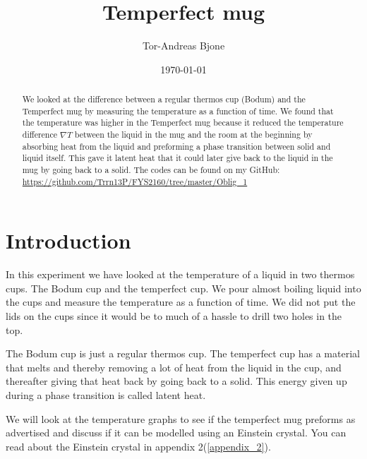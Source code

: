 \documentclass[reprint,english,notitlepage]{revtex4-1}  %
\begin{document}
\title{Temperfect mug}   %
\author{Tor-Andreas Bjone}               %
\date{\today}                             %
\noaffiliation                            %
\begin{abstract}                          %
We looked at the difference between a regular thermos cup (Bodum) and the Temperfect mug by measuring the temperature as a function of time. We found that the temperature was higher in the Temperfect mug because it reduced the temperature difference $\nabla T$ between the liquid in the mug and the room at the beginning by absorbing heat from the liquid and preforming a phase transition between solid and liquid itself. This gave it latent heat that it could later give back to the liquid in the mug by going back to a solid. The codes can be found on my GitHub: \url{https://github.com/Trrn13P/FYS2160/tree/master/Oblig_1}
\end{abstract}                            %
\maketitle                                %


\section{Introduction}
In this experiment we have looked at the temperature of a liquid in two thermos cups. The Bodum cup and the temperfect cup. We pour almost boiling liquid into the cups and measure the temperature as a function of time. We did not put the lids on the cups since it would be to much of a hassle to drill two holes in the top. 

The Bodum cup is just a regular thermos cup. The temperfect cup has a material that melts and thereby removing a lot of heat from the liquid in the cup, and thereafter giving that heat back by going back to a solid. This energy given up during a phase transition is called latent heat. 

We will look at the temperature graphs to see if the temperfect mug preforms as advertised and discuss if it can be modelled using an Einstein crystal. You can read about the Einstein crystal in appendix 2(\ref{appendix_2}).
\end{document}
